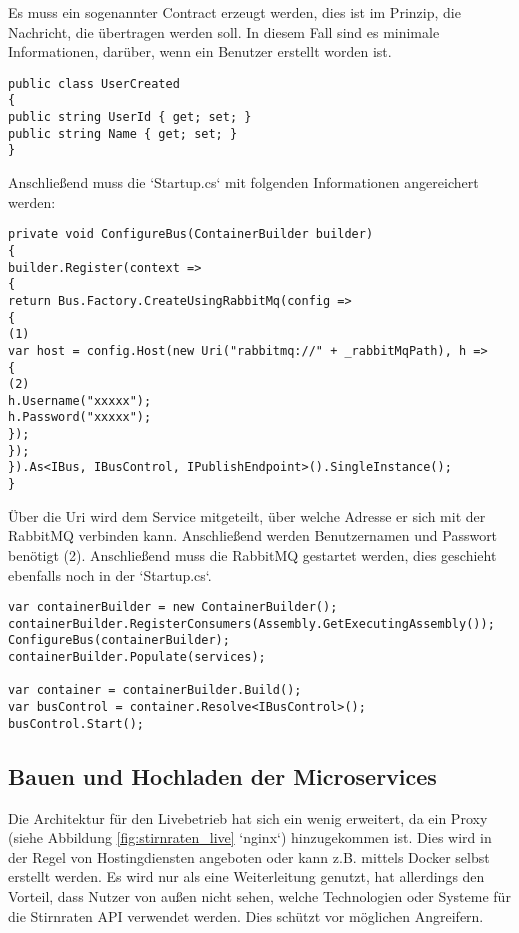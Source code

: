 Es muss ein sogenannter Contract erzeugt werden, dies ist im Prinzip, die Nachricht, die übertragen werden soll. In diesem Fall sind es minimale Informationen, darüber, wenn ein Benutzer erstellt worden ist.

\begin{verbatim}
public class UserCreated
{
public string UserId { get; set; }
public string Name { get; set; }
}
\end{verbatim}

Anschließend muss die `Startup.cs` mit folgenden Informationen angereichert werden: 

\begin{verbatim}
private void ConfigureBus(ContainerBuilder builder)
{
builder.Register(context =>
{
return Bus.Factory.CreateUsingRabbitMq(config =>
{ 
(1)
var host = config.Host(new Uri("rabbitmq://" + _rabbitMqPath), h =>
{
(2)
h.Username("xxxxx"); 
h.Password("xxxxx");
});
});
}).As<IBus, IBusControl, IPublishEndpoint>().SingleInstance();
}
\end{verbatim}

Über die Uri wird dem Service mitgeteilt, über welche Adresse er sich mit der RabbitMQ verbinden kann. Anschließend werden Benutzernamen und Passwort benötigt (2). Anschließend muss die RabbitMQ gestartet werden, dies geschieht ebenfalls noch in der `Startup.cs`.

\begin{verbatim}
var containerBuilder = new ContainerBuilder();
containerBuilder.RegisterConsumers(Assembly.GetExecutingAssembly());
ConfigureBus(containerBuilder);
containerBuilder.Populate(services);

var container = containerBuilder.Build();
var busControl = container.Resolve<IBusControl>();
busControl.Start();
\end{verbatim}



\subsection{Bauen und Hochladen der Microservices}

Die Architektur für den Livebetrieb hat sich ein wenig erweitert, da ein Proxy (siehe Abbildung \ref{fig:stirnraten_live} `nginx`) hinzugekommen ist. Dies wird in der Regel von Hostingdiensten angeboten oder kann z.B. mittels Docker selbst erstellt werden. Es wird nur als eine Weiterleitung genutzt, hat allerdings den Vorteil, dass Nutzer von außen nicht sehen, welche Technologien oder Systeme für die Stirnraten API verwendet werden. Dies schützt vor möglichen Angreifern.

